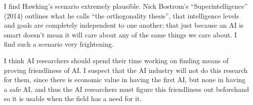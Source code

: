 \documentclass[12pt]{article}
\begin{document}
\problemsub
I find Hawking's scenario extremely plausible. Nick Bostrom's ``Superintelligence'' (2014) outlines what he calls ``the
orthogonality thesis'', that intelligence levels and goals are completely independent to one another; that just because
an AI is smart doesn't mean it will care about any of the same things we care about. I find such a scenario very
frightening.

\problemsub
I think AI researchers should spend their time working on finding means of proving friendliness of AI. I suspect that
the AI industry will not do this research for them, since there is economic value in having the first AI, but none in
having a safe AI, and thus the AI researchers must figure this friendliness out beforehand so it is usable when the
field has a need for it.
\end{document}
